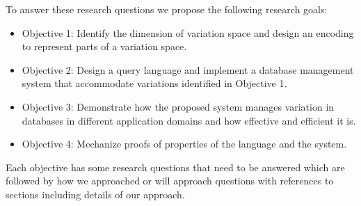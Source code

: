 To answer these research questions we propose the following research goals:

\begin{itemize}
\item Objective 1: Identify the dimension of variation space and design an encoding to represent parts of a variation space.
\item Objective 2: Design a query language and implement a database management 
system that accommodate  variations identified in Objective 1.
\item Objective 3: Demonstrate how the proposed system manages
variation in databases in different application domains and how effective and efficient it is.
\item Objective 4: Mechanize proofs of properties of the language and the system.
\end{itemize}


Each objective has some research questions that need to be answered
which are followed by how we approached or will approach questions with references to
sections including details of our approach.

